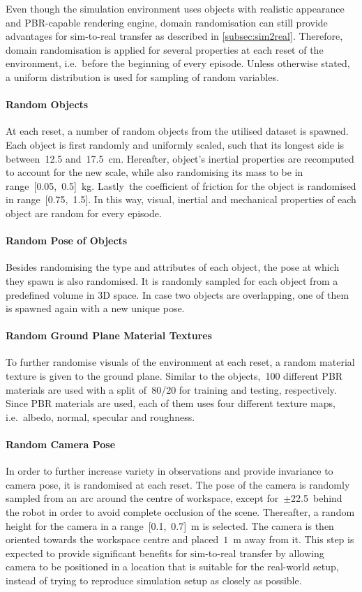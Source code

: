 Even though the simulation environment uses objects with realistic appearance and PBR-capable rendering engine, domain randomisation can still provide advantages for sim-to-real transfer as described in \autoref{subsec:sim2real}. Therefore, domain randomisation is applied for several properties at each reset of the environment, i.e.~before the beginning of every episode. Unless otherwise stated, a uniform distribution is used for sampling of random variables.

\paragraph{Random Objects} At each reset, a number of random objects from the utilised dataset is spawned. Each object is first randomly and uniformly scaled, such that its longest side is between~12.5 and~17.5~cm. Hereafter, object's inertial properties are recomputed to account for the new scale, while also randomising its mass to be in range~[0.05,~0.5]~kg. Lastly~the coefficient of friction for the object is randomised in range~[0.75,~1.5]. In this way, visual, inertial and mechanical properties of each object are random for every episode.

\paragraph{Random Pose of Objects} Besides randomising the type and attributes of each object, the pose at which they spawn is also randomised. It is randomly sampled for each object from a predefined volume in 3D space. In case two objects are overlapping, one of them is spawned again with a new unique pose.

\paragraph{Random Ground Plane Material Textures} To further randomise visuals of the environment at each reset, a random material texture is given to the ground plane. Similar to the objects,~100 different PBR materials are used with a split of~80/20 for training and testing, respectively. Since PBR materials are used, each of them uses four different texture maps, i.e.~albedo, normal, specular and roughness.

\paragraph{Random Camera Pose} In order to further increase variety in observations and provide invariance to camera pose, it is randomised at each reset. The pose of the camera is randomly sampled from an arc around the centre of workspace, except for~\(\pm\)22.5\textdegree\ behind the robot in order to avoid complete occlusion of the scene. Thereafter, a random height for the camera in a range~[0.1,~0.7]~m is selected. The camera is then oriented towards the workspace centre and placed~\(1\)~m away from it. This step is expected to provide significant benefits for sim-to-real transfer by allowing camera to be positioned in a location that is suitable for the real-world setup, instead of trying to reproduce simulation setup as closely as possible.

